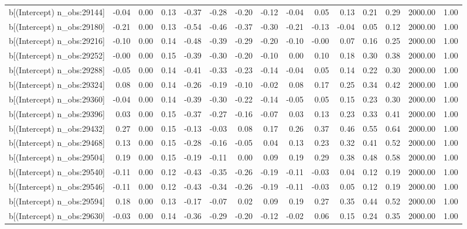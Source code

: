 \begin{table}[ht]
\begin{tabular}{rrrrrrrrrrrrrrr}
  b[(Intercept) n\_obs:29144] & -0.04 & 0.00 & 0.13 & -0.37 & -0.28 & -0.20 & -0.12 & -0.04 & 0.05 & 0.13 & 0.21 & 0.29 & 2000.00 & 1.00 \\ 
  b[(Intercept) n\_obs:29180] & -0.21 & 0.00 & 0.13 & -0.54 & -0.46 & -0.37 & -0.30 & -0.21 & -0.13 & -0.04 & 0.05 & 0.12 & 2000.00 & 1.00 \\ 
  b[(Intercept) n\_obs:29216] & -0.10 & 0.00 & 0.14 & -0.48 & -0.39 & -0.29 & -0.20 & -0.10 & -0.00 & 0.07 & 0.16 & 0.25 & 2000.00 & 1.00 \\ 
  b[(Intercept) n\_obs:29252] & -0.00 & 0.00 & 0.15 & -0.39 & -0.30 & -0.20 & -0.10 & 0.00 & 0.10 & 0.18 & 0.30 & 0.38 & 2000.00 & 1.00 \\ 
  b[(Intercept) n\_obs:29288] & -0.05 & 0.00 & 0.14 & -0.41 & -0.33 & -0.23 & -0.14 & -0.04 & 0.05 & 0.14 & 0.22 & 0.30 & 2000.00 & 1.00 \\ 
  b[(Intercept) n\_obs:29324] & 0.08 & 0.00 & 0.14 & -0.26 & -0.19 & -0.10 & -0.02 & 0.08 & 0.17 & 0.25 & 0.34 & 0.42 & 2000.00 & 1.00 \\ 
  b[(Intercept) n\_obs:29360] & -0.04 & 0.00 & 0.14 & -0.39 & -0.30 & -0.22 & -0.14 & -0.05 & 0.05 & 0.15 & 0.23 & 0.30 & 2000.00 & 1.00 \\ 
  b[(Intercept) n\_obs:29396] & 0.03 & 0.00 & 0.15 & -0.37 & -0.27 & -0.16 & -0.07 & 0.03 & 0.13 & 0.23 & 0.33 & 0.41 & 2000.00 & 1.00 \\ 
  b[(Intercept) n\_obs:29432] & 0.27 & 0.00 & 0.15 & -0.13 & -0.03 & 0.08 & 0.17 & 0.26 & 0.37 & 0.46 & 0.55 & 0.64 & 2000.00 & 1.00 \\ 
  b[(Intercept) n\_obs:29468] & 0.13 & 0.00 & 0.15 & -0.28 & -0.16 & -0.05 & 0.04 & 0.13 & 0.23 & 0.32 & 0.41 & 0.52 & 2000.00 & 1.00 \\ 
  b[(Intercept) n\_obs:29504] & 0.19 & 0.00 & 0.15 & -0.19 & -0.11 & 0.00 & 0.09 & 0.19 & 0.29 & 0.38 & 0.48 & 0.58 & 2000.00 & 1.00 \\ 
  b[(Intercept) n\_obs:29540] & -0.11 & 0.00 & 0.12 & -0.43 & -0.35 & -0.26 & -0.19 & -0.11 & -0.03 & 0.04 & 0.12 & 0.19 & 2000.00 & 1.00 \\ 
  b[(Intercept) n\_obs:29546] & -0.11 & 0.00 & 0.12 & -0.43 & -0.34 & -0.26 & -0.19 & -0.11 & -0.03 & 0.05 & 0.12 & 0.19 & 2000.00 & 1.00 \\ 
  b[(Intercept) n\_obs:29594] & 0.18 & 0.00 & 0.13 & -0.17 & -0.07 & 0.02 & 0.09 & 0.19 & 0.27 & 0.35 & 0.44 & 0.52 & 2000.00 & 1.00 \\ 
  b[(Intercept) n\_obs:29630] & -0.03 & 0.00 & 0.14 & -0.36 & -0.29 & -0.20 & -0.12 & -0.02 & 0.06 & 0.15 & 0.24 & 0.35 & 2000.00 & 1.00 \\ 

\end{tabular}
\end{table}
